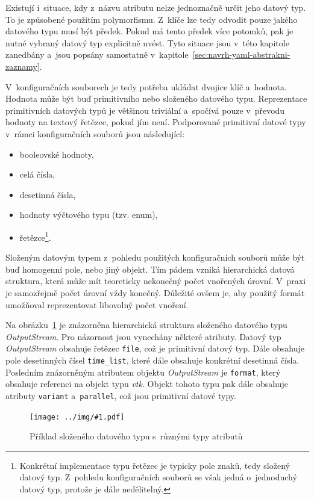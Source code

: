 \documentclass[FM,bw,DP]{tulthesis}
\newcommand{\includeimg}[2]{%
\begin{figure}[h]
	\centering
    \texttt{[image: ../img/\#1.pdf]}
    \caption{#2}
	\label{img:#1}
\end{figure}
}
\begin{document}
Existují i~situace, kdy z~názvu atributu nelze jednoznačně určit jeho datový typ. To je způsobené použitím polymorfismu. Z~klíče lze tedy odvodit pouze jakého datového typu musí být předek. Pokud má tento předek více potomků, pak je nutné vybraný datový typ explicitně uvést. Tyto situace jsou v~této kapitole zanedbány a~jsou popsány samostatně v~kapitole~\ref{sec:navrh-yaml-abstrakni-zaznamy}.

V~konfiguračních souborech je tedy potřeba ukládat dvojice klíč a~hodnota. Hodnota může být buď primitivního nebo složeného datového typu. Reprezentace primitivních datových typů je většinou triviální a~spočívá pouze v~převodu hodnoty na textový řetězec, pokud jím není. Podporované primitivní datové typy v~rámci konfiguračních souborů jsou následující:

\begin{itemize}
	\item booleovské hodnoty,
	\item celá čísla,
	\item desetinná čísla,
	\item hodnoty výčtového typu (tzv. enum),
	\item řetězce\footnote{Konkrétní implementace typu řetězec je typicky pole znaků, tedy složený datový typ. Z~pohledu konfiguračních souborů se však jedná o~jednoduchý datový typ, protože je dále nedělitelný.}.
\end{itemize}

Složeným datovým typem z~pohledu použitých konfiguračních souborů může být buď homogenní pole, nebo jiný objekt. Tím pádem vzniká hierarchická datová struktura, která může mít teoreticky nekonečný počet vnořených úrovní. V~praxi je samozřejmě počet úrovní vždy konečný. Důležité ovšem je, aby použitý formát umožňoval reprezentovat libovolný počet vnoření.

Na obrázku~\ref{img:data_tree} je znázorněna hierarchická struktura složeného datového typu \textit{OutputStream}. Pro názornost jsou vynechány některé atributy. Datový typ \textit{OutputStream} obsahuje řetězec \texttt{file}, což je primitivní datový typ. Dále obsahuje pole desetinných čísel \texttt{time\_list}, které dále obsahuje konkrétní desetinná čísla. Posledním znázorněným atributem objektu \textit{OutputStream} je \texttt{format}, který obsahuje referenci na objekt typu \textit{vtk}. Objekt tohoto typu pak dále obsahuje atributy \texttt{variant} a~\texttt{parallel}, což jsou primitivní datové typy.

\includeimg{data_tree}{Příklad složeného datového typu s~různými typy atributů}
\end{document}
